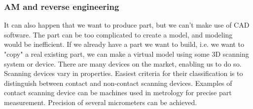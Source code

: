 \documentclass[a4paper, twoside, 11pt]{report}
\begin{document}
\subsubsection{AM and reverse engineering}
It can also happen that we want to produce part, but we can't make use of CAD software. The part can be too complicated to create a model, and modeling would be inefficient. If we already have a part we want to build, i.e. we want to "copy" a real existing part, we can make a virtual model using some 3D scanning system or device. There are many devices on the market, enabling us to do so. Scanning devices vary in properties. Easiest criteria for their classification is to distinguish between contact and non-contact scanning devices. Examples of contact scanning device can be machines used in metrology for precise part measurement. Precision of several micrometers can be achieved.\\
%
\end{document}
